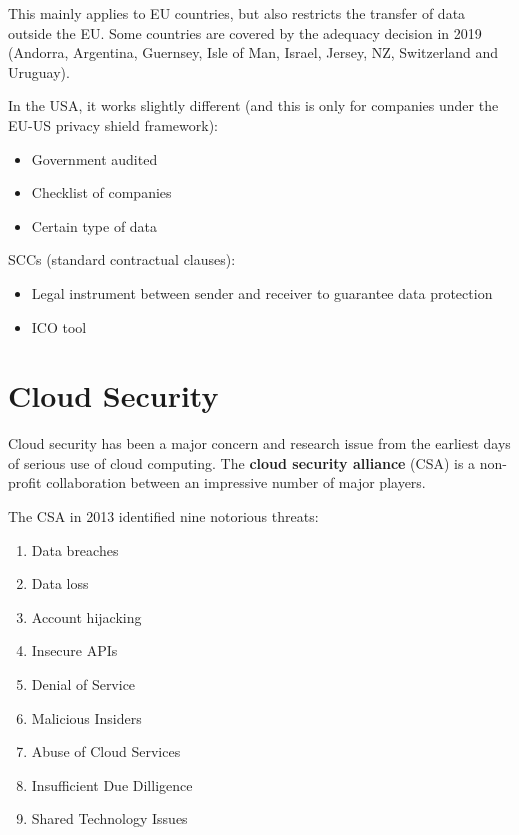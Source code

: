 \documentclass[11pt,a4paper,titlepage,dvipsnames,cmyk]{scrartcl}
\begin{document}
This mainly applies to EU countries, but also restricts the transfer of data outside the EU. Some countries are covered by the adequacy decision in 2019 (Andorra, Argentina, Guernsey, Isle of Man, Israel, Jersey, NZ, Switzerland and Uruguay).

In the USA, it works slightly different (and this is only for companies under the EU-US privacy shield framework):
\begin{itemize}
    \item Government audited
    \item Checklist of companies
    \item Certain type of data
\end{itemize}

SCCs (standard contractual clauses):
\begin{itemize}
    \item Legal instrument between sender and receiver to guarantee data protection
    \item ICO tool
\end{itemize}

\section{Cloud Security}
Cloud security has been a major concern and research issue from the earliest days of serious use of cloud computing. The \textbf{cloud security alliance} (CSA) is a non-profit collaboration between an impressive number of major players.

The CSA in 2013 identified nine notorious threats:
\begin{enumerate}
\item Data breaches
\item Data loss
\item Account hijacking
\item Insecure APIs
\item Denial of Service
\item Malicious Insiders
\item Abuse of Cloud Services
\item Insufficient Due Dilligence
\item Shared Technology Issues
\end{enumerate}
\end{document}
